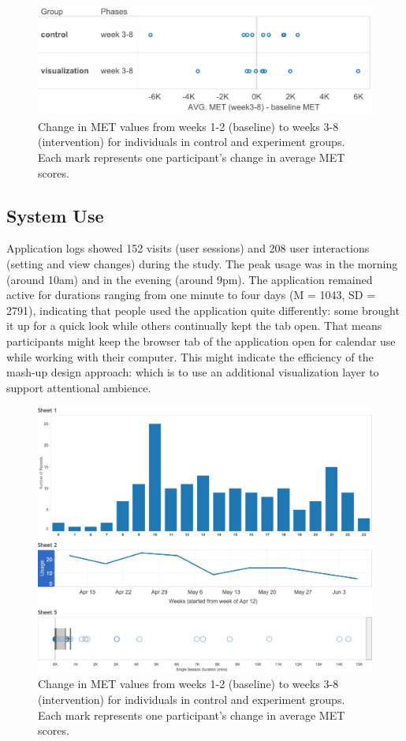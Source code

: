 \documentclass[12pt,oneside]{book}
\begin{document}
\begin{figure}[h]
\centering
\includegraphics[width=\columnwidth]{figures/avgMET}
\caption{Change in MET values from weeks 1-2 (baseline) to weeks 3-8 (intervention) for individuals in control and experiment groups. Each mark represents one participant’s change in average MET scores. }
\label{fig:mets}
\end{figure}

\subsection{System Use}
Application logs showed 152 visits (user sessions) and 208 user interactions (setting and view changes) during the study. The peak usage was in the morning (around 10am) and in the evening (around 9pm). The application remained active for durations ranging from one minute to four days (M = 1043, SD = 2791), indicating that people used the application quite differently: some brought it up for a quick look while others continually kept the tab open. That means participants might keep the browser tab of the application open for calendar use while working with their computer. This might indicate the efficiency of the mash-up design approach: which is to use an additional visualization layer to support attentional ambience. 

\begin{figure}[h]
\centering
\includegraphics[width=\columnwidth]{figures/usage}
\caption{Change in MET values from weeks 1-2 (baseline) to weeks 3-8 (intervention) for individuals in control and experiment groups. Each mark represents one participant’s change in average MET scores. }
\label{fig:system_use}
\end{figure}
\end{document}

